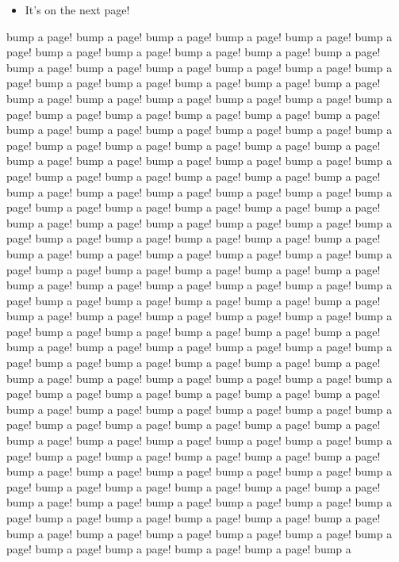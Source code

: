 \documentclass[11pt]{book}
\begin{document}
\begin{itemize}

\item It's on the next page!
\end{itemize}
bump a page! bump a page! bump a page! bump a page! bump a page! bump a page! bump a
page! bump a page! bump a page!
bump a page! bump a page! bump a page! bump a page! bump a page! bump a page! bump a
page! bump a page! bump a page!
bump a page! bump a page! bump a page! bump a page! bump a page! bump a page! bump a
page! bump a page! bump a page!
bump a page! bump a page! bump a page! bump a page! bump a page! bump a page! bump a
page! bump a page! bump a page!
bump a page! bump a page! bump a page! bump a page! bump a page! bump a page! bump a
page! bump a page! bump a page!
bump a page! bump a page! bump a page! bump a page! bump a page! bump a page! bump a
page! bump a page! bump a page!
bump a page! bump a page! bump a page! bump a page! bump a page! bump a page! bump a
page! bump a page! bump a page!
bump a page! bump a page! bump a page! bump a page! bump a page! bump a page! bump a
page! bump a page! bump a page!
bump a page! bump a page! bump a page! bump a page! bump a page! bump a page! bump a
page! bump a page! bump a page!
bump a page! bump a page! bump a page! bump a page! bump a page! bump a page! bump a
page! bump a page! bump a page!
bump a page! bump a page! bump a page! bump a page! bump a page! bump a page! bump a
page! bump a page! bump a page!
bump a page! bump a page! bump a page! bump a page! bump a page! bump a page! bump a
page! bump a page! bump a page!
bump a page! bump a page! bump a page! bump a page! bump a page! bump a page! bump a
page! bump a page! bump a page!
bump a page! bump a page! bump a page! bump a page! bump a page! bump a page! bump a
page! bump a page! bump a page!
bump a page! bump a page! bump a page! bump a page! bump a page! bump a page! bump a
page! bump a page! bump a page!
bump a page! bump a page! bump a page! bump a page! bump a page! bump a page! bump a
page! bump a page! bump a page!
bump a page! bump a page! bump a page! bump a page! bump a page! bump a page! bump a
page! bump a page! bump a page!
bump a page! bump a page! bump a page! bump a page! bump a page! bump a page! bump a
page! bump a page! bump a page!
bump a page! bump a page! bump a page! bump a page! bump a page! bump a page! bump a
page! bump a page! bump a page!
bump a page! bump a page! bump a page! bump a page! bump a page! bump a page! bump a
page! bump a page! bump a page!
bump a page! bump a page! bump a page! bump a page! bump a page! bump a page! bump a
\end{document}
